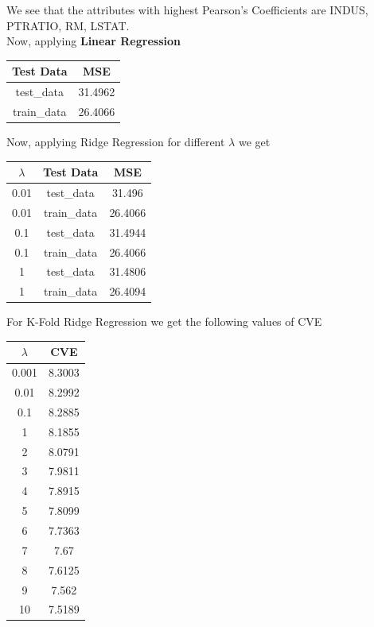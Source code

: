 \documentclass[]{report}
\begin{document}
		We see that the attributes with highest Pearson's Coefficients are INDUS, PTRATIO, RM, LSTAT.\\

		Now, applying \textbf{Linear Regression}
	    \begin{center}
	    \begin{tabular}{c | c}
	        \hline
	        Test Data & MSE \\
	        \hline
	        test\_data & 31.4962 \\
	        train\_data & 26.4066
	    \end{tabular}
	    \end{center}

	    Now, applying Ridge Regression for different $\lambda$ we get

	    \begin{center}
	    \begin{tabular}{c|c|c}
			\hline
			   $\lambda$ & Test Data    &     MSE \\
			\hline
			     0.01 & test\_data  & 31.496  \\
			     0.01 & train\_data & 26.4066 \\
			     0.1  & test\_data  & 31.4944 \\
			     0.1  & train\_data & 26.4066 \\
			     1    & test\_data  & 31.4806 \\
			     1    & train\_data & 26.4094 \\
			\hline
		\end{tabular}
	    \end{center}

	    For K-Fold Ridge Regression we get the following values of CVE

	    \begin{center}
	    \begin{tabular}{c | c}
			\hline
			   $\lambda$ &    CVE \\
			\hline
			    0.001 & 8.3003 \\
			    0.01  & 8.2992 \\
			    0.1   & 8.2885 \\
			    1     & 8.1855 \\
			    2     & 8.0791 \\
			    3     & 7.9811 \\
			    4     & 7.8915 \\
			    5     & 7.8099 \\
			    6     & 7.7363 \\
			    7     & 7.67   \\
			    8     & 7.6125 \\
			    9     & 7.562  \\
			   10     & 7.5189 \\
			\hline
			\end{tabular}
	    \end{center}
\end{document}
